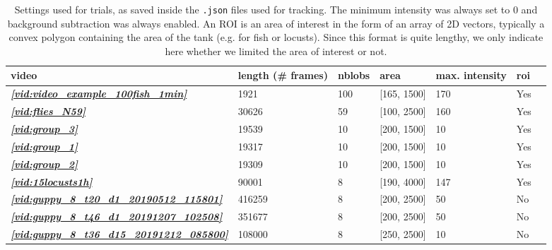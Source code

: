\documentclass[9pt,lineno]{elife}
\newcommand{\figref}[1]{\textit{\textbf{\ref{#1}}}}
\newcommand{\vidref}[1]{\textit{\textbf{\ref{#1}}}}
\newcommand{\idtracker}{\protect\path{ idtracker.ai}}
\begin{document}
\begin{table}[t]
\begin{tabular}{l | l l l l l l}
\toprule
video & length (\# frames)  & nblobs & area & max. intensity & roi \\
\midrule
\vidref{vid:video_example_100fish_1min} & 1921 & 100 & [165, 1500] & 170 & Yes \\
\vidref{vid:flies_N59} & 30626 & 59 & [100, 2500] & 160 & Yes \\
\vidref{vid:group_3} & 19539 & 10 & [200, 1500] & 10 & Yes \\
\vidref{vid:group_1} & 19317 & 10 & [200, 1500] & 10 & Yes \\
\vidref{vid:group_2} & 19309 & 10 & [200, 1500] & 10 & Yes \\
\vidref{vid:15locusts1h} & 90001 & 8 & [190, 4000] & 147 & Yes \\
\vidref{vid:guppy_8_t20_d1_20190512_115801} & 416259 & 8 & [200, 2500] & 50 & No \\
\vidref{vid:guppy_8_t46_d1_20191207_102508} & 351677 & 8 & [200, 2500] & 50 & No \\
\vidref{vid:guppy_8_t36_d15_20191212_085800} & 108000 & 8 & [250, 2500] & 10 & No \\
\bottomrule
\end{tabular}

\medskip
\caption{\label{tab:settings_idtracker} Settings used for \idtracker{} trials, as saved inside the \texttt{.json} files used for tracking. The minimum intensity was always set to 0 and background subtraction was always enabled. An ROI is an area of interest in the form of an array of 2D vectors, typically a convex polygon containing the area of the tank (e.g. for fish or locusts). Since this format is quite lengthy, we only indicate here whether we limited the area of interest or not.}
\end{table}

\end{document}
